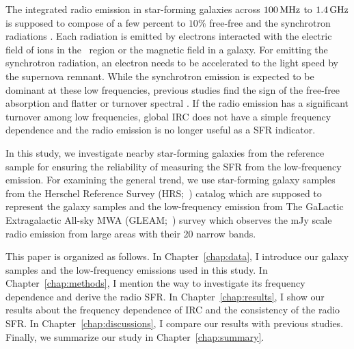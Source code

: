 The integrated radio emission in star-forming galaxies across $100\,\mathrm{MHz}$ to $1.4\,\mathrm{GHz}$ is supposed to compose of a few percent to $10\%$ free-free and the synchrotron radiations \citep{Condon1992a}.
Each radiation is emitted by electrons interacted with the electric field of ions in the \ih~region or the magnetic field in a galaxy.
For emitting the synchrotron radiation, an electron needs to be accelerated to the light speed by the supernova remnant.
While the synchrotron emission is expected to be dominant at these low frequencies, previous studies find the sign of the free-free absorption and flatter or turnover spectral \citep{Schober2017, Chyzy2018}.
If the radio emission has a significant turnover among low frequencies, global IRC does not have a simple frequency dependence and the radio emission is no longer useful as a SFR indicator.

In this study, we investigate nearby star-forming galaxies from the reference sample for ensuring the reliability of measuring the SFR from the low-frequency emission.
For examining the general trend, we use star-forming galaxy samples from the Herschel Reference Survey (HRS;~\citealt{Boselli2010}) catalog which are supposed to represent the galaxy samples and the low-frequency emission from The GaLactic Extragalactic All-sky MWA (GLEAM;~\citealt{Hurley-Walker2017a}) survey which observes the mJy scale radio emission from large areas with their 20 narrow bands.

This paper is organized as follows.
In Chapter~\ref{chap:data}, I introduce our galaxy samples and the low-frequency emissions used in this study.
In Chapter~\ref{chap:methods}, I mention the way to investigate its frequency dependence and derive the radio SFR\@.
In Chapter~\ref{chap:results}, I show our results about the frequency dependence of IRC and the consistency of the radio SFR\@.
In Chapter~\ref{chap:discussions}, I compare our results with previous studies.
Finally, we summarize our study in Chapter~\ref{chap:summary}.



%
%




